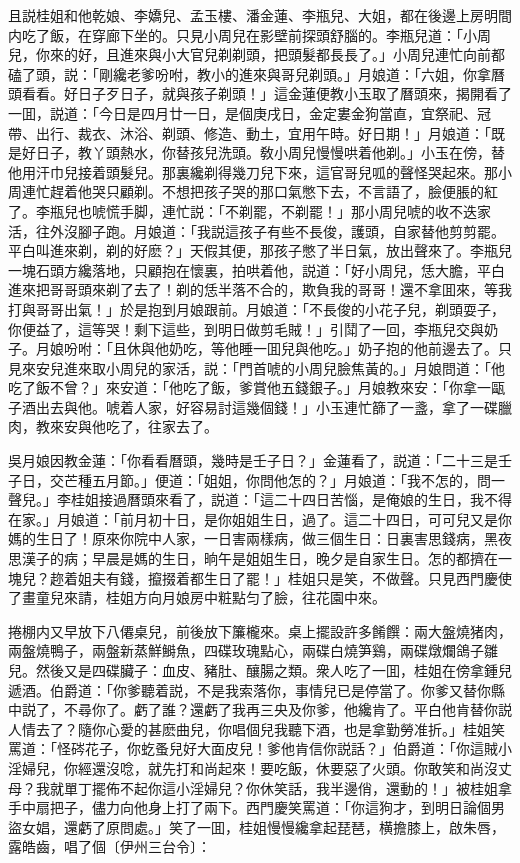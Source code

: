 且説桂姐和他乾娘、李嬌兒、孟玉樓、潘金蓮、李瓶兒、大姐，都在後邊上房明間内吃了飯，在穿廊下坐的。只見小周兒在影壁前探頭舒腦的。李瓶兒道：「小周兒，你來的好，且進來與小大官兒剃剃頭，把頭髮都長長了。」小周兒連忙向前都磕了頭，説：「剛纔老爹吩咐，教小的進來與哥兒剃頭。」月娘道：「六姐，你拿曆頭看看。好日子歹日子，就與孩子剃頭！」這金蓮便教小玉取了曆頭來，揭開看了一囬，説道：「今日是四月廿一日，是個庚戌日，金定婁金狗當直，宜祭祀、冠帶、出行、裁衣、沐浴、剃頭、修造、動土，宜用午時。好日期！」月娘道：「既是好日子，教丫頭熱水，你替孩兒洗頭。敎小周兒慢慢哄着他剃。」小玉在傍，替他用汗巾兒接着頭髮兒。那裏纔剃得幾刀兒下來，這官哥兒呱的聲怪哭起來。那小周連忙趕着他哭只顧剃。不想把孩子哭的那口氣憋下去，不言語了，臉便脹的紅了。李瓶兒也唬慌手脚，連忙説：「不剃罷，不剃罷！」那小周兒唬的收不迭家活，往外沒腳子跑。月娘道：「我説這孩子有些不長俊，護頭，自家替他剪剪罷。平白叫進來剃，剃的好麽？」天假其便，那孩子憋了半日氣，放出聲來了。李瓶兒一塊石頭方纔落地，只顧抱在懷裏，拍哄着他，説道：「好小周兒，恁大膽，平白進來把哥哥頭來剃了去了！剃的恁半落不合的，欺負我的哥哥！還不拿囬來，等我打與哥哥出氣！」於是抱到月娘跟前。月娘道：「不長俊的小花子兒，剃頭耍子，你便益了，這等哭！剩下這些，到明日做剪毛賊！」引鬦了一回，李瓶兒交與奶子。月娘吩咐：「且休與他奶吃，等他睡一囬兒與他吃。」奶子抱的他前邊去了。只見來安兒進來取小周兒的家活，説：「門首唬的小周兒臉焦黃的。」月娘問道：「他吃了飯不曾？」來安道：「他吃了飯，爹賞他五錢銀子。」月娘教來安：「你拿一甌子酒出去與他。唬着人家，好容易討這幾個錢！」小玉連忙篩了一盞，拿了一碟臘肉，教來安與他吃了，往家去了。

吳月娘因教金蓮：「你看看曆頭，幾時是壬子日？」金蓮看了，説道：「二十三是壬子日，交芒種五月節。」便道：「姐姐，你問他怎的？」月娘道：「我不怎的，問一聲兒。」李桂姐接過曆頭來看了，説道：「這二十四日苦惱，是俺娘的生日，我不得在家。」月娘道：「前月初十日，是你姐姐生日，過了。這二十四日，可可兒又是你媽的生日了！原來你院中人家，一日害兩樣病，做三個生日：日裏害思錢病，黑夜思漢子的病；早晨是媽的生日，晌午是姐姐生日，晚夕是自家生日。怎的都擠在一塊兒？趂着姐夫有錢，攛掇着都生日了罷！」桂姐只是笑，不做聲。只見西門慶使了畫童兒來請，桂姐方向月娘房中粧點匀了臉，往花園中來。

捲棚内又早放下八僊桌兒，前後放下簾櫳來。桌上擺設許多餚饌：兩大盤燒猪肉，兩盤燒鴨子，兩盤新蒸鮮鰣魚，四碟玫瑰點心，兩碟白燒笋鷄，兩碟燉爛鴿子雛兒。然後又是四碟臟子：血皮、豬肚、釀腸之類。衆人吃了一囬，桂姐在傍拿鍾兒遞酒。伯爵道：「你爹聽着説，不是我索落你，事情兒已是停當了。你爹又替你縣中説了，不尋你了。虧了誰？還虧了我再三央及你爹，他纔肯了。平白他肯替你説人情去了？隨你心愛的甚麽曲兒，你唱個兒我聽下酒，也是拿勤勞准折。」桂姐笑罵道：「怪硶花子，你虼蚤兒好大面皮兒！爹他肯信你説話？」伯爵道：「你這賊小淫婦兒，你經還沒唸，就先打和尚起來！要吃飯，休要惡了火頭。你敢笑和尚沒丈母？我就單丁擺佈不起你這小淫婦兒？你休笑話，我半邊俏，還動的！」被桂姐拿手中扇把子，儘力向他身上打了兩下。西門慶笑罵道：「你這狗才，到明日論個男盜女娼，還虧了原問處。」笑了一囬，桂姐慢慢纔拿起琵琶，横擔膝上，啟朱唇，露皓齒，唱了個〔伊州三台令〕：

